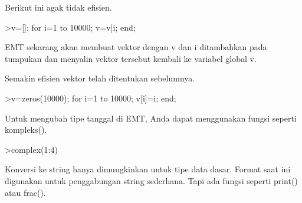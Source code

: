 \documentclass[a4paper,10pt]{article}
\begin{document}
\begin{eulernotebook}
\begin{eulercomment}
\begin{eulercomment}
\begin{eulercomment}
Berikut ini agak tidak efisien.
\end{eulercomment}
\begin{eulerprompt}
>v=[]; for i=1 to 10000; v=v|i; end;
\end{eulerprompt}
\begin{eulercomment}
EMT sekarang akan membuat vektor dengan v dan i ditambahkan pada
tumpukan dan menyalin vektor tersebut kembali ke variabel global v.

Semakin efisien vektor telah ditentukan sebelumnya.
\end{eulercomment}
\begin{eulerprompt}
>v=zeros(10000); for i=1 to 10000; v[i]=i; end;
\end{eulerprompt}
\begin{eulercomment}
Untuk mengubah tipe tanggal di EMT, Anda dapat menggunakan fungsi
seperti kompleks().
\end{eulercomment}
\begin{eulerprompt}
>complex(1:4)
\end{eulerprompt}
\begin{euleroutput}
  [ 1+0i ,  2+0i ,  3+0i ,  4+0i  ]
\end{euleroutput}
\begin{eulercomment}
Konversi ke string hanya dimungkinkan untuk tipe data dasar. Format
saat ini digunakan untuk penggabungan string sederhana. Tapi ada
fungsi seperti print() atau frac().


\end{eulercomment}
\end{eulercomment}
\end{eulercomment}
\end{eulernotebook}
\end{document}
